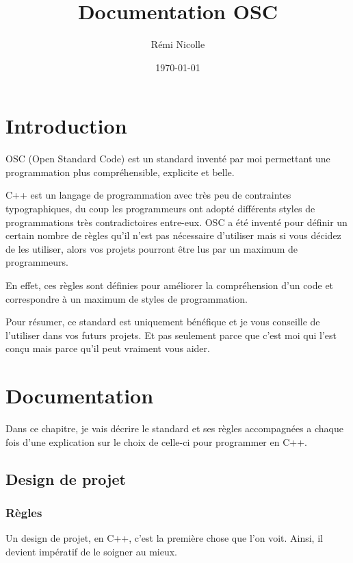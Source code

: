 \documentclass[a4paper,12pt]{report}
\title{Documentation OSC}
\author{Rémi Nicolle}
\date{\today}
\begin{document}
\maketitle
\tableofcontents
\newpage

\chapter{Introduction}

\fbox
{
    \begin{minipage}[c]{17cm}
        OSC (Open Standard Code) est un standard inventé par moi 
        permettant une programmation plus compréhensible, explicite 
        et belle.
    \end{minipage}
} \newline{} \newline{}

C++ est un langage de programmation avec très peu de contraintes 
typographiques, du coup les programmeurs ont adopté différents styles 
de programmations très contradictoires entre-eux. OSC a été inventé 
pour définir un certain nombre de règles qu'il n'est pas nécessaire 
d'utiliser mais si vous décidez de les utiliser, alors vos projets 
pourront être lus par un maximum de programmeurs.\newline

En effet, ces règles sont définies pour améliorer la compréhension d'un 
code et correspondre à un maximum de styles de programmation. \newline

Pour résumer, ce standard est uniquement bénéfique et je vous conseille 
de l'utiliser dans vos futurs projets. Et pas seulement parce que c'est 
moi qui l'est conçu mais parce qu'il peut vraiment vous aider.

\chapter{Documentation}

Dans ce chapitre, je vais décrire le standard et ses règles accompagnées 
a chaque fois d'une explication sur le choix de celle-ci pour programmer 
en C++.

\section{Design de projet}
\subsection{Règles}
Un design de projet, en C++, c'est la première chose que l'on voit.
Ainsi, il devient impératif de le soigner au mieux.\newline
\end{document}
